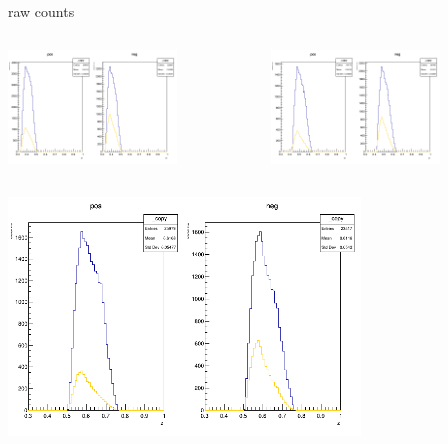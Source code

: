 \begin{frame}{raw counts}
\begin{columns}
\begin{column}[T]{0.5\textwidth}
\includegraphics[width = 0.7\textwidth]{results/yield/statistics/counts_x_Q2_z_0.35_4.000_0.40.png}
\end{column}
\begin{column}[T]{0.5\textwidth}
\includegraphics[width = 0.7\textwidth]{results/yield/statistics/counts_x_Q2_z_0.35_4.000_0.50.png}
\end{column}
\end{columns}
\begin{columns}
\begin{column}[T]{0.5\textwidth}
\includegraphics[width = 0.7\textwidth]{results/yield/statistics/counts_x_Q2_z_0.35_4.000_0.60.png}

\end{column}
\end{columns}
\end{frame}
